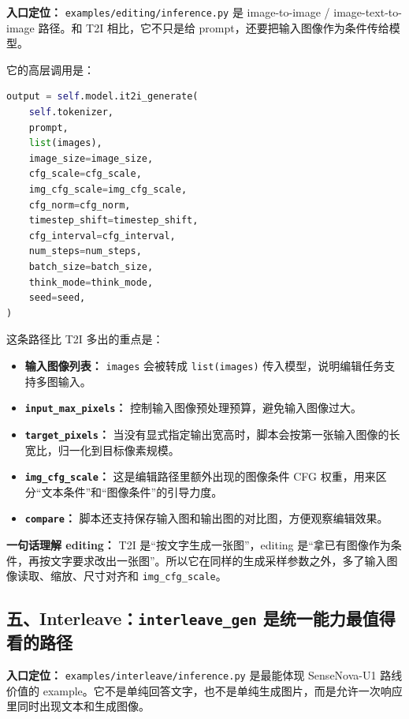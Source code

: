 \begin{conceptbox}
\textbf{入口定位：} \texttt{examples/editing/inference.py} 是 image-to-image / image-text-to-image 路径。和 T2I 相比，它不只是给 prompt，还要把输入图像作为条件传给模型。
\end{conceptbox}

它的高层调用是：

\begin{lstlisting}[language=Python]
output = self.model.it2i_generate(
    self.tokenizer,
    prompt,
    list(images),
    image_size=image_size,
    cfg_scale=cfg_scale,
    img_cfg_scale=img_cfg_scale,
    cfg_norm=cfg_norm,
    timestep_shift=timestep_shift,
    cfg_interval=cfg_interval,
    num_steps=num_steps,
    batch_size=batch_size,
    think_mode=think_mode,
    seed=seed,
)
\end{lstlisting}

这条路径比 T2I 多出的重点是：

\begin{itemize}[leftmargin=1.5em]
  \item \textbf{输入图像列表：} \texttt{images} 会被转成 \texttt{list(images)} 传入模型，说明编辑任务支持多图输入。
  \item \textbf{\texttt{input\_max\_pixels}：} 控制输入图像预处理预算，避免输入图像过大。
  \item \textbf{\texttt{target\_pixels}：} 当没有显式指定输出宽高时，脚本会按第一张输入图像的长宽比，归一化到目标像素规模。
  \item \textbf{\texttt{img\_cfg\_scale}：} 这是编辑路径里额外出现的图像条件 CFG 权重，用来区分“文本条件”和“图像条件”的引导力度。
  \item \textbf{\texttt{compare}：} 脚本还支持保存输入图和输出图的对比图，方便观察编辑效果。
\end{itemize}

\begin{summarybox}
\textbf{一句话理解 editing：} T2I 是“按文字生成一张图”，editing 是“拿已有图像作为条件，再按文字要求改出一张图”。所以它在同样的生成采样参数之外，多了输入图像读取、缩放、尺寸对齐和 \texttt{img\_cfg\_scale}。
\end{summarybox}

\subsection{五、Interleave：\texttt{interleave\_gen} 是统一能力最值得看的路径}

\begin{conceptbox}
\textbf{入口定位：} \texttt{examples/interleave/inference.py} 是最能体现 SenseNova-U1 路线价值的 example。它不是单纯回答文字，也不是单纯生成图片，而是允许一次响应里同时出现文本和生成图像。
\end{conceptbox}

